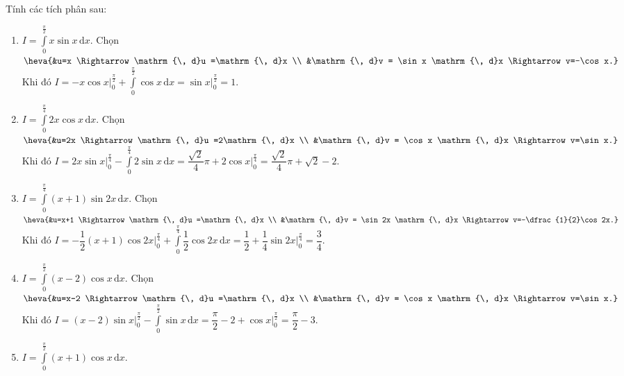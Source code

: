     \begin{bt}%
    Tính các tích phân  sau:
    \begin{enumerate}
    \item $I=\displaystyle\int\limits_0^{\tfrac{\pi}{2}} x\sin x \mathrm{\, d}x$.
    \loigiai
    {
    Chọn $\heva{&u=x \Rightarrow \mathrm{\, d}u =\mathrm{\, d}x \\ &\mathrm{\, d}v = \sin x \mathrm{\, d}x \Rightarrow v=-\cos x.}$\\
    Khi đó $I=-x\cos x\Big|_0^{\tfrac{\pi}{2}} + \displaystyle\int\limits_0^{\tfrac{\pi}{2}}\cos x \mathrm{\, d}x
    = \sin x \Big|_0^{\tfrac{\pi}{2}} = 1$.
    }
    \item $I=\displaystyle\int\limits_0^{\tfrac{\pi}{4}} 2x\cos x \mathrm{\, d}x$.
    \loigiai
    {
    Chọn $\heva{&u=2x \Rightarrow \mathrm{\, d}u =2\mathrm{\, d}x \\ &\mathrm{\, d}v = \cos x \mathrm{\, d}x \Rightarrow v=\sin x.}$\\
    Khi đó $I=2x\sin x\Big|_0^{\tfrac{\pi}{4}} - \displaystyle\int\limits_0^{\tfrac{\pi}{4}}2\sin x \mathrm{\, d}x
    =\dfrac{\sqrt{2}}{4}\pi+2\cos x \Big|_0^{\tfrac{\pi}{4}} = \dfrac{\sqrt{2}}{4}\pi+\sqrt{2}-2$.
    }
    \item $I=\displaystyle\int\limits_0^{\tfrac{\pi}{4}} (x+1)\sin 2x \mathrm{\, d}x$.
    \loigiai
    {
    Chọn $\heva{&u=x+1 \Rightarrow \mathrm{\, d}u =\mathrm{\, d}x \\ &\mathrm{\, d}v = \sin 2x \mathrm{\, d}x \Rightarrow v=-\dfrac{1}{2}\cos2x.}$\\
    Khi đó $I=-\dfrac{1}{2}(x+1)\cos2x\Big|_0^{\tfrac{\pi}{4}} + \displaystyle\int\limits_0^{\tfrac{\pi}{4}}\dfrac{1}{2}\cos2x \mathrm{\, d}x
    =\dfrac{1}{2}+\dfrac{1}{4}\sin2x\Big|_0^{\tfrac{\pi}{4}} = \dfrac{3}{4}$.
    }
    \item $I=\displaystyle\int\limits_0^{\tfrac{\pi}{2}} (x-2)\cos x \mathrm{\, d}x$.
    \loigiai
    {
    Chọn $\heva{&u=x-2 \Rightarrow \mathrm{\, d}u =\mathrm{\, d}x \\ &\mathrm{\, d}v = \cos x \mathrm{\, d}x \Rightarrow v=\sin x.}$\\
    Khi đó $I=(x-2)\sin x\Big|_0^{\tfrac{\pi}{2}} - \displaystyle\int\limits_0^{\tfrac{\pi}{2}}\sin x \mathrm{\, d}x
    =\dfrac{\pi}{2}-2+\cos x\Big|_0^{\tfrac{\pi}{2}} = \dfrac{\pi}{2}-3$.
    }
    \item $I=\displaystyle\int\limits_0^{\tfrac{\pi}{2}} (x+1)\cos x \mathrm{\, d}x$.

\end{enumerate}
\end{bt}
